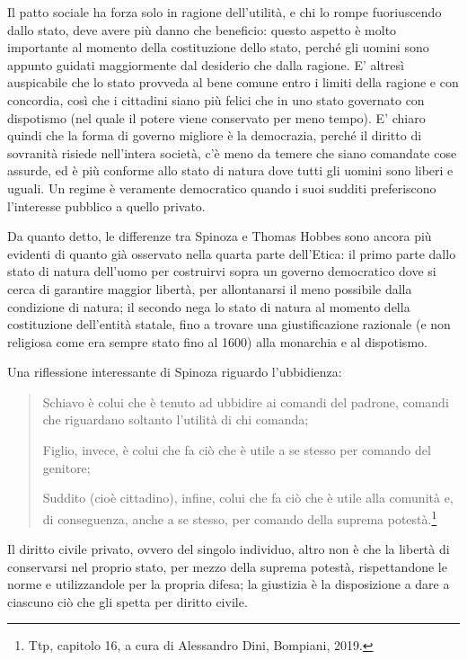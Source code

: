 Il patto sociale ha forza solo in ragione dell'utilità, e chi lo rompe fuoriuscendo dallo stato, deve avere più danno che beneficio: questo aspetto è molto importante al momento della costituzione dello stato, perché gli uomini sono appunto guidati maggiormente dal desiderio che dalla ragione. E' altresì auspicabile che lo stato provveda al bene comune entro i limiti della ragione e con concordia, così che i cittadini siano più felici che in uno stato governato con dispotismo (nel quale il potere viene conservato per meno tempo). E' chiaro quindi che la forma di governo migliore è la democrazia, perché il diritto di sovranità risiede nell'intera società, c'è meno da temere che siano comandate cose assurde, ed è più conforme allo stato di natura dove tutti gli uomini sono liberi e uguali. Un regime è veramente democratico quando i suoi sudditi preferiscono l'interesse pubblico a quello privato.

Da quanto detto, le differenze tra Spinoza e Thomas Hobbes sono ancora più evidenti di quanto già osservato nella quarta parte dell'Etica: il primo parte dallo stato di natura dell'uomo per costruirvi sopra un governo democratico dove si cerca di garantire maggior libertà, per allontanarsi il meno possibile dalla condizione di natura; il secondo nega lo stato di natura al momento della costituzione dell'entità statale, fino a trovare una giustificazione razionale (e non religiosa come era sempre stato fino al 1600) alla monarchia e al dispotismo.

Una riflessione interessante di Spinoza riguardo l'ubbidienza:
\begin{quotation}
	\small	
	Schiavo è colui che è tenuto ad ubbidire ai comandi del padrone, comandi che riguardano soltanto l'utilità di chi comanda;
	
	Figlio, invece, è colui che fa ciò che è utile a se stesso per comando del genitore;
		
	Suddito (cioè cittadino), infine, colui che fa ciò che è utile alla comunità e, di conseguenza, anche a se stesso, per comando della suprema potestà.\footnote{Ttp, capitolo 16, a cura di Alessandro Dini, Bompiani, 2019.}
	

\end{quotation}

Il diritto civile privato, ovvero del singolo individuo, altro non è che la libertà di conservarsi nel proprio stato, per mezzo della suprema potestà, rispettandone le norme e utilizzandole per la propria difesa; la giustizia è la disposizione a dare a ciascuno ciò che gli spetta per diritto civile.

